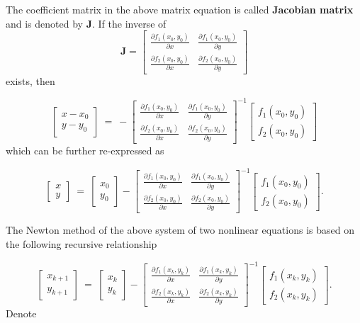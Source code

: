 \documentclass[
]{book}
\begin{document}
The coefficient matrix in the above matrix equation is called \textbf{Jacobian
matrix} and is denoted by \textbf{J}. If the inverse of \[
\mathbf{J} = \left[
\begin{array}{cc}
\frac{\partial f_1(x_0, y_0)}{\partial x} & \frac{\partial f_1(x_0,y_0)}{\partial y}\\
\frac{\partial f_2(x_0, y_0)}{\partial x} & \frac{\partial f_2(x_0,y_0)}{\partial y}
\end{array}
\right]
\] exists, then

\[
\left[
\begin{array}{cc}
x-x_0 \\
y-y_0
\end{array}
\right]
~=~ -
\left[
\begin{array}{cc}
\frac{\partial f_1(x_0, y_0)}{\partial x} & \frac{\partial f_1(x_0,y_0)}{\partial y}\\
\frac{\partial f_2(x_0, y_0)}{\partial x} & \frac{\partial f_2(x_0,y_0)}{\partial y}
\end{array}
\right]^{-1}
\left[
\begin{array}{cc}
f_1(x_0,y_0)\\
f_2(x_0,y_0)
\end{array}
\right]
\] which can be further re-expressed as

\[
\left[
\begin{array}{cc}
x \\
y
\end{array}
\right]
~=~
\left[
\begin{array}{cc}
x_0 \\
y_0
\end{array}
\right]
-
\left[
\begin{array}{cc}
\frac{\partial f_1(x_0, y_0)}{\partial x} & \frac{\partial f_1(x_0,y_0)}{\partial y}\\
\frac{\partial f_2(x_0, y_0)}{\partial x} & \frac{\partial f_2(x_0,y_0)}{\partial y}
\end{array}
\right]^{-1}
\left[
\begin{array}{cc}
f_1(x_0,y_0)\\
f_2(x_0,y_0)
\end{array}
\right].
\]

The Newton method of the above system of two nonlinear equations is
based on the following recursive relationship

\[
\left[
\begin{array}{cc}
x_{k+1} \\
y_{k+1}
\end{array}
\right]
~=~
\left[
\begin{array}{cc}
x_k \\
y_k
\end{array}
\right]
-
\left[
\begin{array}{cc}
\frac{\partial f_1(x_k, y_k)}{\partial x} & \frac{\partial f_1(x_k,y_k)}{\partial y}\\
\frac{\partial f_2(x_k, y_k)}{\partial x} & \frac{\partial f_2(x_k,y_k)}{\partial y}
\end{array}
\right]^{-1}
\left[
\begin{array}{cc}
f_1(x_k,y_k)\\
f_2(x_k,y_k)
\end{array}
\right].
\] Denote
\end{document}

